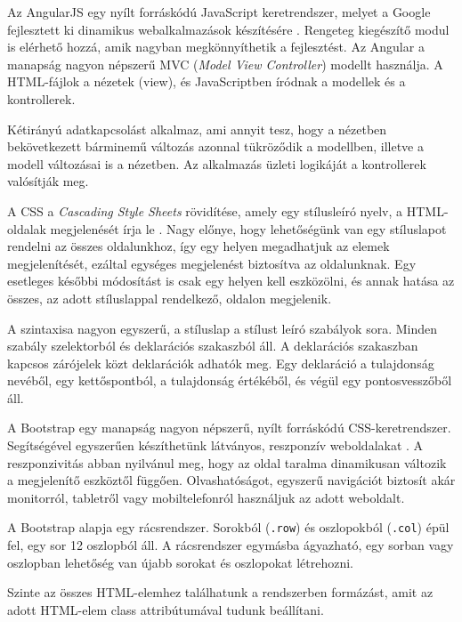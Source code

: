 
Az AngularJS egy nyílt forráskódú JavaScript keretrendszer, melyet a Google fejlesztett ki dinamikus webalkalmazások készítésére \cite{angularjs}. Rengeteg kiegészítő modul is elérhető hozzá, amik nagyban megkönnyíthetik a fejlesztést. Az Angular a manapság nagyon népszerű MVC (\textit{Model View Controller}) modellt használja. A HTML-fájlok a nézetek (view), és JavaScriptben íródnak a modellek és a kontrollerek.

Kétirányú adatkapcsolást alkalmaz, ami annyit tesz, hogy a nézetben bekövetkezett bárminemű változás azonnal tükröződik a modellben, illetve a modell változásai is a nézetben. Az alkalmazás üzleti logikáját a kontrollerek valósítják meg.


A CSS a \textit{Cascading Style Sheets} rövidítése, amely egy stílusleíró nyelv, a HTML-oldalak megjelenését írja le \cite{css}. Nagy előnye, hogy lehetőségünk van egy stíluslapot rendelni az összes oldalunkhoz, így egy helyen megadhatjuk az elemek megjelenítését, ezáltal egységes megjelenést biztosítva az oldalunknak. Egy esetleges későbbi módosítást is csak egy helyen kell eszközölni, és annak hatása az összes, az adott stíluslappal rendelkező, oldalon megjelenik.

A szintaxisa nagyon egyszerű, a stíluslap a stílust leíró szabályok sora. Minden szabály szelektorból és deklarációs szakaszból áll. A deklarációs szakaszban kapcsos zárójelek közt deklarációk adhatók meg. Egy deklaráció a tulajdonság nevéből, egy kettőspontból, a tulajdonság értékéből, és végül egy pontosvesszőből áll.


A Bootstrap egy manapság nagyon népszerű, nyílt forráskódú CSS-keretrendszer. Segítségével egyszerűen készíthetünk látványos, reszponzív weboldalakat \cite{bootstrap}. A reszponzivitás abban nyilvánul meg, hogy az oldal taralma dinamikusan változik a megjelenítő eszköztől függően. Olvashatóságot, egyszerű navigációt biztosít akár monitorról, tabletről vagy mobiltelefonról használjuk az adott weboldalt.

A Bootstrap alapja egy rácsrendszer. Sorokból (\texttt{.row}) és oszlopokból (\texttt{.col}) épül fel, egy sor 12 oszlopból áll. A rácsrendszer egymásba ágyazható, egy sorban vagy oszlopban lehetőség van újabb sorokat és oszlopokat létrehozni.

Szinte az összes HTML-elemhez találhatunk a rendszerben formázást, amit az adott HTML-elem class attribútumával tudunk beállítani.

